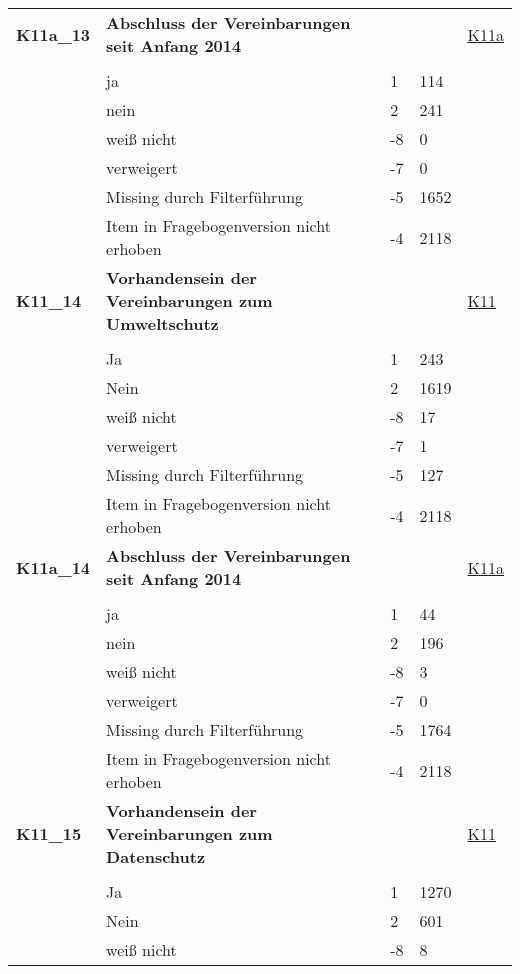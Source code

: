 \begin{longtable}{| L{2.5cm} | L{8.25cm}| C{1.5cm} | R{1.25cm} | C{2.25cm} |  }
   \midrule
\textbf{K11a\_13}\label{var:suf:K11a:13} & \textbf{Abschluss der Vereinbarungen seit Anfang 2014} &  &  & \hyperref[K11a]{K11a} \\ 
   &  &  &  &  \\ 
   & ja & 1 & 114 &  \\ 
   & nein & 2 & 241 &  \\ 
   & weiß nicht & -8 & 0 &  \\ 
   & verweigert & -7 & 0 &  \\ 
   & Missing durch Filterführung & -5 & 1652 &  \\ 
   & Item in Fragebogenversion nicht erhoben & -4 & 2118 &  \\ 
   \midrule
\textbf{K11\_14}\label{var:suf:K11:14} & \textbf{Vorhandensein der Vereinbarungen zum Umweltschutz} &  &  & \hyperref[K11]{K11} \\ 
   &  &  &  &  \\ 
   & Ja & 1 & 243 &  \\ 
   & Nein & 2 & 1619 &  \\ 
   & weiß nicht & -8 & 17 &  \\ 
   & verweigert & -7 & 1 &  \\ 
   & Missing durch Filterführung & -5 & 127 &  \\ 
   & Item in Fragebogenversion nicht erhoben & -4 & 2118 &  \\ 
   \midrule
\textbf{K11a\_14}\label{var:suf:K11a:14} & \textbf{Abschluss der Vereinbarungen seit Anfang 2014} &  &  & \hyperref[K11a]{K11a} \\ 
   &  &  &  &  \\ 
   & ja & 1 & 44 &  \\ 
   & nein & 2 & 196 &  \\ 
   & weiß nicht & -8 & 3 &  \\ 
   & verweigert & -7 & 0 &  \\ 
   & Missing durch Filterführung & -5 & 1764 &  \\ 
   & Item in Fragebogenversion nicht erhoben & -4 & 2118 &  \\ 
   \midrule
\textbf{K11\_15}\label{var:suf:K11:15} & \textbf{Vorhandensein der Vereinbarungen zum Datenschutz} &  &  & \hyperref[K11]{K11} \\ 
   &  &  &  &  \\ 
   & Ja & 1 & 1270 &  \\ 
   & Nein & 2 & 601 &  \\ 
   & weiß nicht & -8 & 8 &  \\ 

\end{longtable}
